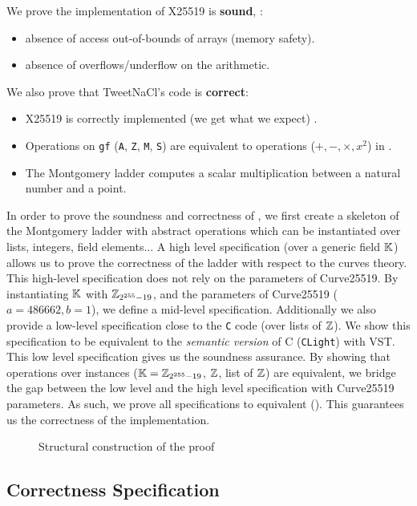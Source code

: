 We prove the implementation of X25519 is \textbf{sound}, \ie:
\begin{itemize}
\item absence of access out-of-bounds of arrays (memory safety).
\item absence of overflows/underflow on the arithmetic.
\end{itemize}
We also prove that TweetNaCl's code is \textbf{correct}:
\begin{itemize}
\item X25519 is correctly implemented (we get what we expect) .
\item Operations on \texttt{gf} (\texttt{A}, \texttt{Z}, \texttt{M}, \texttt{S})
are equivalent to operations ($+,-,\times,x^2$) in \Zfield.
\item The Montgomery ladder computes a scalar multiplication between a natural
number and a point.
\end{itemize}

In order to prove the soundness and correctness of ,
we first create a skeleton of the Montgomery ladder with abstract operations which
can be instantiated over lists, integers, field elements...
A high level specification (over a generic field $\mathbb{K}$) allows us to prove the
correctness of the ladder with respect to the curves theory.
This high-level specification does not rely on the parameters of Curve25519.
By instantiating $\mathbb{K}$ with $\mathbb{Z}_{2^{255}-19}$, and the parameters of Curve25519 ($a = 486662, b = 1$),
we define a mid-level specification.
Additionally we also provide a low-level specification close to the \texttt{C} code
(over lists of $\mathbb{Z}$). We show this specification to be equivalent to the
\textit{semantic version} of C (\texttt{CLight}) with VST.
This low level specification gives us the soundness assurance.
By showing that operations over instances ($\mathbb{K} = \mathbb{Z}_{2^{255}-19}$, $\mathbb{Z}$, list of $\mathbb{Z}$) are
equivalent, we bridge the gap between the low level and the high level specification
with Curve25519 parameters.
As such, we prove all specifications to equivalent ().
This guarantees us the correctness of the implementation.

\begin{figure}[h]
  \centering
  
  \caption{Structural construction of the proof}
  \label{tikz:ProofStructure}
\end{figure}

\subsection{Correctness Specification}

